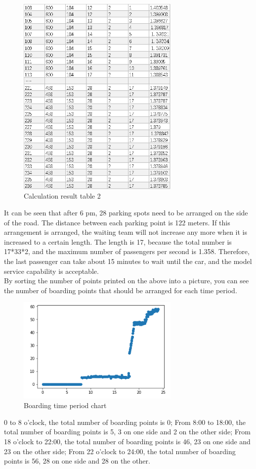 \begin{figure}[H]
\centering
\includegraphics[width=0.7\textwidth]{figures/data3_4.png}
\caption{Calculation result table 2}
\label{fig:label}
\end{figure}
It can be seen that after 6 pm, 28 parking spots need to be arranged on the side of the road. The distance between each parking point is 122 meters. If this arrangement is arranged, the waiting team will not increase any more when it is increased to a certain length. The length is 17, because the total number is 17*33*2, and the maximum number of passengers per second is 1.358. Therefore, the last passenger can take about 15 minutes to wait until the car, and the model service capability is acceptable.\\
\indent By sorting the number of points printed on the above into a picture, you can see the number of boarding points that should be arranged for each time period.
\begin{figure}[H]
\centering
\includegraphics[width=0.7\textwidth]{figures/data3_5.png}
\caption{Boarding time period chart}
\label{fig:label}
\end{figure}
0 to 8 o'clock, the total number of boarding points is 0;
From 8:00 to 18:00, the total number of boarding points is 5, 3 on one side and 2 on the other side;
From 18 o'clock to 22:00, the total number of boarding points is 46, 23 on one side and 23 on the other side;
From 22 o'clock to 24:00, the total number of boarding points is 56, 28 on one side and 28 on the other.

